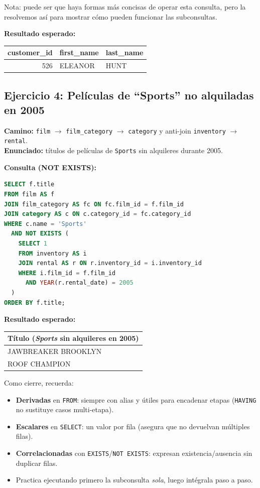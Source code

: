 \documentclass[12pt,a4paper]{article}
\begin{document}
Nota: puede ser que haya formas más concisas de operar esta consulta, pero la resolvemos así para mostrar cómo pueden funcionar las subconsultas.

\textbf{Resultado esperado:}
\begin{center}
\begin{tabular}{r l l}
\hline
customer\_id & first\_name & last\_name \\
\hline
526 & ELEANOR & HUNT \\
\hline
\end{tabular}
\end{center}

\subsection*{Ejercicio 4: Películas de ``Sports'' no alquiladas en 2005}
\textbf{Camino:} \texttt{film} $\rightarrow$ \texttt{film\_category} $\rightarrow$ \texttt{category} y anti-join \texttt{inventory} $\rightarrow$ \texttt{rental}. \\
\textbf{Enunciado:} títulos de películas de \texttt{Sports} sin alquileres durante 2005.

\textbf{Consulta (NOT EXISTS):}
\begin{lstlisting}[language=SQL]
SELECT f.title
FROM film AS f
JOIN film_category AS fc ON fc.film_id = f.film_id
JOIN category AS c ON c.category_id = fc.category_id
WHERE c.name = 'Sports'
  AND NOT EXISTS (
    SELECT 1
    FROM inventory AS i
    JOIN rental AS r ON r.inventory_id = i.inventory_id
    WHERE i.film_id = f.film_id
      AND YEAR(r.rental_date) = 2005
  )
ORDER BY f.title;
\end{lstlisting}

\textbf{Resultado esperado:}
\begin{center}
\begin{tabular}{l}
\hline
Título (\textit{Sports} sin alquileres en 2005) \\
\hline
JAWBREAKER BROOKLYN \\
ROOF CHAMPION \\
\hline
\end{tabular}
\end{center}

\vspace{1em}

Como cierre, recuerda:
\begin{itemize}
  \item \textbf{Derivadas} en \texttt{FROM}: siempre con alias y útiles para encadenar etapas (\texttt{HAVING} no sustituye casos multi-etapa).
  \item \textbf{Escalares} en \texttt{SELECT}: un valor por fila (asegura que no devuelvan múltiples filas).
  \item \textbf{Correlacionadas} con \texttt{EXISTS}/\texttt{NOT EXISTS}: expresan existencia/ausencia sin duplicar filas.
  \item Practica ejecutando primero la subconsulta \textit{sola}, luego intégrala paso a paso.
\end{itemize}
\end{document}
